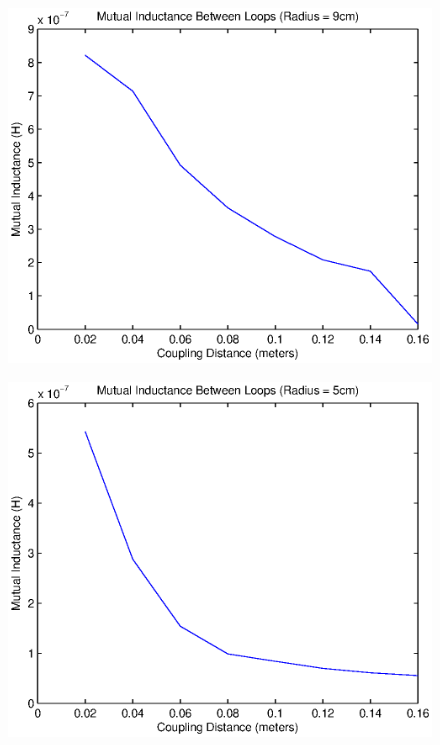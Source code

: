 \documentclass{article}
\begin{document}
\begin{multicols}{2}
\setlength{\premulticols}{1pt}
\setlength{\postmulticols}{1pt}
\setlength{\multicolsep}{1pt}
\setlength{\columnsep}{2pt}
	
	\begin{figure}[H]
	\centering
   		\includegraphics[scale=0.66]{./Matlab/9cm.eps}
	\end{figure}
	\begin{figure}[H]
	\centering
		\includegraphics[scale=0.66]{./Matlab/5cm.eps}
	
	\end{figure}
\end{multicols}
\end{document}
